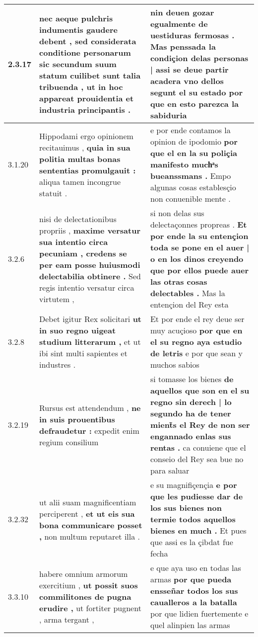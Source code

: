 \begin{tabular}{|p{1cm}|p{6.5cm}|p{6.5cm}|}
2.3.17 & nec aeque pulchris indumentis gaudere debent , \textbf{ sed considerata conditione personarum sic secundum suum statum cuilibet sunt talia tribuenda , } ut in hoc appareat prouidentia et industria principantis . & nin deuen gozar egualmente de uestiduras fermosas . \textbf{ Mas penssada la condiçion delas personas | assi se deue partir acadera vno dellos segunt el su estado } por que en esto parezca la sabiduria \\\hline
3.1.20 & Hippodami ergo opinionem recitauimus , \textbf{ quia in sua politia multas bonas sententias promulgauit : } aliqua tamen incongrue statuit . & e por ende contamos la opinion de ipodomio \textbf{ por que el en la su poliçia manifesto muchͣs bueanssmans . } Empo algunas cosas establesçio non conuenible mente . \\\hline
3.2.6 & nisi de delectationibus propriis , \textbf{ maxime versatur sua intentio circa pecuniam , credens se per eam posse huiusmodi delectabilia obtinere . } Sed regis intentio versatur circa virtutem , & si non delas sus delectaçonnes propreas . \textbf{ Et por ende la su entençion toda se pone en el auer | o en los dinos creyendo que por ellos puede auer las otras cosas delectables . } Mas la entençion del Rey esta \\\hline
3.2.8 & Debet igitur Rex solicitari \textbf{ ut in suo regno uigeat studium litterarum , } et ut ibi sint multi sapientes et industres . & Et por ende el rey deue ser muy acuçioso \textbf{ por que en el su regno aya estudio de letris } e por que sean y muchos sabios \\\hline
3.2.19 & Rursus est attendendum , \textbf{ ne in suis prouentibus defraudetur : } expedit enim regium consilium & si tomasse los bienes \textbf{ de aquellos que son en el su regno sin derech | lo segundo ha de tener mient̃s el Rey de non ser engannado enlas sus rentas . } ca conuiene que el conseio del Rey sea bue no para saluar \\\hline
3.2.32 & ut alii suam magnificentiam perciperent , \textbf{ et ut eis sua bona communicare posset , } non multum reputaret illa . & e su magnifiçençia \textbf{ e por que les pudiesse dar de los sus bienes non termie todos aquellos bienes en much . } Et pues que assi es la çibdat fue fecha \\\hline
3.3.10 & habere omnium armorum exercitium , \textbf{ ut possit suos commilitones de pugna erudire , } ut fortiter pugnent , arma tergant , & e que aya uso en todas las armas \textbf{ por que pueda ensseñar todos los sus caualleros a la batalla } por que lidien fuertemente e quel alinpien las armas \\\hline

\end{tabular}
